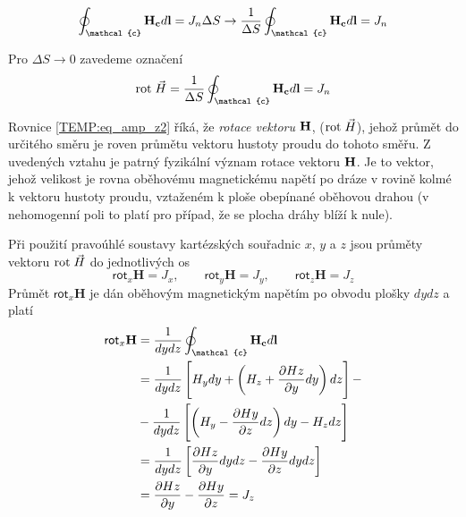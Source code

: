       \begin{equation}\label{TEMP:eq_amp_z1}
        \oint_{\mathcal{c}}\vr{H_c}d\vr{l}  =
           J_n \Delta S \rightarrow \frac{1}{\Delta S}\oint_{\mathcal{c}}\vr{H_c}d\vr{l} = J_n
      \end{equation} 
      
      Pro $\Delta S \rightarrow 0$ zavedeme označení 
      \begin{equation}\label{TEMP:eq_amp_z2}
        \rot{H}  = \frac{1}{\Delta S}\oint_{\mathcal{c}}\vr{H_c}d\vr{l}  = J_n
      \end{equation}
      
      Rovnice \ref{TEMP:eq_amp_z2} říká, že \emph{rotace vektoru} $\mathbf{H}$, ($\mathrm{rot}\;\vec{H}$), jehož
      průmět do určitého směru je roven průmětu vektoru hustoty proudu do tohoto směřu. Z uvedených
      vztahu je patrný fyzikální význam rotace vektoru $\mathbf{H}$. Je to vektor, jehož velikost je
      rovna oběhovému magnetickému napětí po dráze v rovině kolmé k vektoru hustoty proudu,
      vztaženém k ploše obepínané oběhovou drahou (v nehomogenní poli to platí pro případ, že se
      plocha dráhy blíží k nule).
      
      Při použití pravoúhlé soustavy kartézských souřadnic $x$, $y$ a $z$ jsou průměty vektoru
      $\mathrm{rot}\;\vec{H}$ do jednotlivých os
      \begin{equation}\label{TEMP:eq_amp_z3}
        \textsf{rot}_x\mathbf{H} = J_x, \qquad 
        \textsf{rot}_y\mathbf{H} = J_y, \qquad
        \textsf{rot}_z\mathbf{H} = J_z
      \end{equation}      
      Průmět $\textsf{rot}_x\mathbf{H}$ je dán oběhovým magnetickým napětím po obvodu plošky $dydz$
      a platí
      \begin{align}\label{TEMP:eq_amp_z4}
        \textsf{rot}_x\mathbf{H} 
          &= \frac{1}{dydz}\oint_{\mathcal{c}}\vr{H_c}d\vr{l}                 \nonumber \\
          &= \frac{1}{dydz}\left[H_ydy + 
                           \left(H_z + \pder{Hz}{y}dy\right)dz\right] -       \nonumber \\
          &- \frac{1}{dydz}\left[\left(H_y - 
                           \pder{Hy}{z}dz\right)dy - H_zdz\right]             \nonumber \\
          &= \frac{1}{dydz}\left[\pder{Hz}{y}dydz - \pder{Hy}{z}dydz\right]   \nonumber \\
          &= \pder{Hz}{y} - \pder{Hy}{z} = J_z
      \end{align}       
      
